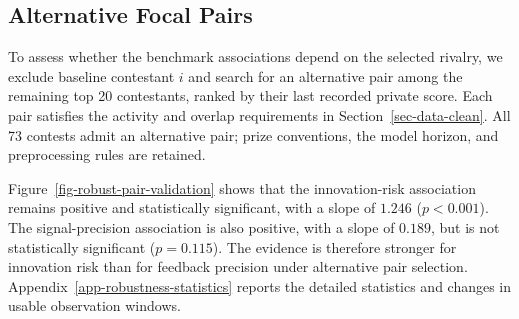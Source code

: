 \documentclass[mnsc]{informs3}
\begin{document}
\subsection{Alternative Focal Pairs}\label{sect-robust-2players}

{To assess whether the benchmark associations depend on the selected rivalry, we exclude baseline contestant $i$ and search for an alternative pair among the remaining top 20 contestants, ranked by their last recorded private score. Each pair satisfies the activity and overlap requirements in Section~\ref{sec-data-clean}. All 73 contests admit an alternative pair; prize conventions, the model horizon, and preprocessing rules are retained.}

Figure~\ref{fig-robust-pair-validation} shows that the innovation-risk association remains positive and statistically significant, with a slope of $1.246$ ($p<0.001$). The signal-precision association is also positive, with a slope of $0.189$, but is not statistically significant ($p=0.115$). The evidence is therefore stronger for innovation risk than for feedback precision under alternative pair selection. Appendix~\ref{app-robustness-statistics} reports the detailed statistics and changes in usable observation windows.
\end{document}
